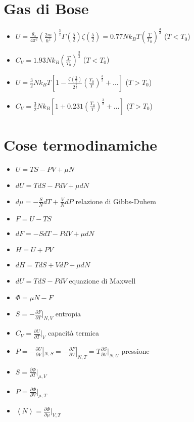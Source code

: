 \documentclass[a4paper]{article}
\begin{document}
    \section{Gas di Bose}
        \begin{itemize}
            \item $U=\frac{g_s}{4\pi^2}\left(\frac{2m}{\hbar^2}\right)^{\frac{3}{2}}\Gamma\left(\frac{5}{2}\right)\zeta\left(\frac{5}{2}\right)=0.77Nk_BT\left(\frac{T}{T_0}\right)^{\frac{3}{2}}$ ($T<T_0$)
            \item $C_V=1.93Nk_B\left(\frac{T}{T_0}\right)^{\frac{3}{2}}$ ($T<T_0$)
            \item $U=\frac{3}{2}Nk_BT\left[1-\frac{\zeta\left(\frac{3}{2}\right)}{2^{\frac{5}{2}}}\left(\frac{T_0}{T}\right)^{\frac{3}{2}}+\ldots\right]$ ($T>T_0$)
            \item $C_V=\frac{3}{2}Nk_B\left[1+0.231\left(\frac{T_0}{T}\right)^{\frac{3}{2}}+\ldots\right]$ ($T>T_0$)
        \end{itemize}

    \section{Cose termodinamiche}
        \begin{itemize}
            \item $U=TS-PV+\mu N$
            \item $dU=TdS-PdV+\mu dN$
            \item $d\mu=-\frac{S}{N}dT+\frac{V}{N}dP$ relazione di Gibbs-Duhem
            \item $F=U-TS$
            \item $dF=-SdT-PdV+\mu dN$
            \item $H=U+PV$
            \item $dH=TdS+VdP+\mu dN$
            \item $dU=TdS-PdV$ equazione di Maxwell
            \item $\Phi=\mu N-F$
            \item $S=-\frac{\partial F}{\partial T}|_{N,V}$ entropia
            \item $C_V=\frac{\partial U}{\partial T}|_{V}$ capacità termica
            \item $P=-\frac{\partial U}{\partial V}|_{N,S}=-\frac{\partial F}{\partial V}|_{N,T}=T\frac{\partial S}{\partial V}|_{N,U}$ pressione
            \item $S=\frac{\partial\Phi}{\partial T}|_{\mu, V}$
            \item $P=\frac{\partial\Phi}{\partial V}|_{\mu,T}$
            \item $\left\langle N \right\rangle=\frac{\partial\Phi}{\partial\mu}|_{V,T}$
        \end{itemize}
\end{document}
